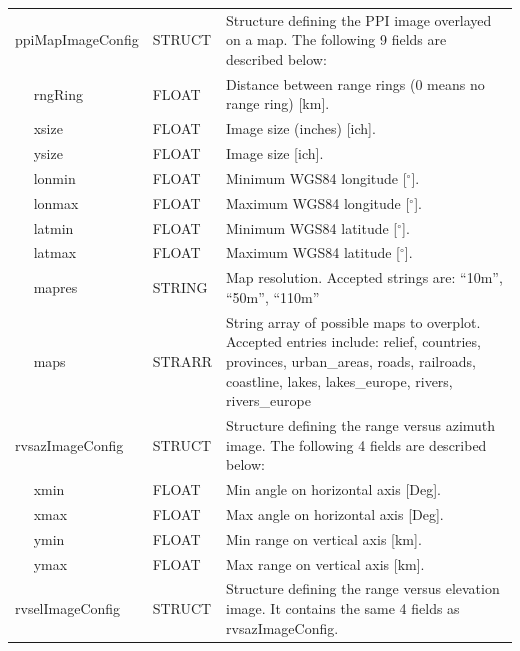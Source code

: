 \documentclass[a4paper,11pt,pdftex,twoside]{scrartcl}
\begin{document}
{{{\begin{longtable}{p{}p{}p{}}
ppiMapImageConfig     & STRUCT & Structure defining the PPI image overlayed on a map. The following 9 fields are described below:\\
$\quad$ rngRing  & FLOAT      & Distance between range rings (0 means no range ring) [km].\\
$\quad$ xsize    & FLOAT      & Image size (inches) [ich].\\
$\quad$ ysize    & FLOAT      & Image size [ich].\\
$\quad$ lonmin   & FLOAT      & Minimum WGS84 longitude [$^\circ$].\\
$\quad$ lonmax   & FLOAT      & Maximum WGS84 longitude [$^\circ$].\\
$\quad$ latmin   & FLOAT      & Minimum WGS84 latitude [$^\circ$].\\
$\quad$ latmax   & FLOAT      & Maximum WGS84 latitude [$^\circ$].\\
$\quad$ mapres   & STRING     & Map resolution. Accepted strings are: ``10m'', ``50m'', ``110m'' \\
$\quad$ maps     & STRARR     & String array of possible maps to overplot. Accepted entries include: 
                                relief, countries, provinces, urban\_areas, roads, railroads, 
                                coastline, lakes, lakes\_europe, rivers, rivers\_europe   \\



rvsazImageConfig     & STRUCT    & Structure defining the range versus azimuth image. The following 4 fields are described below:\\
$\quad$ xmin       & FLOAT     & Min angle on horizontal axis [Deg].\\
$\quad$ xmax       & FLOAT     & Max angle on horizontal axis [Deg].\\
$\quad$ ymin       & FLOAT     & Min range on vertical axis [km].\\
$\quad$ ymax       & FLOAT     & Max range on vertical axis [km].\\

rvselImageConfig     & STRUCT    & Structure defining the range versus elevation image. It contains the same 4 fields as rvsazImageConfig.\\


\end{longtable}}}}
\end{document}
